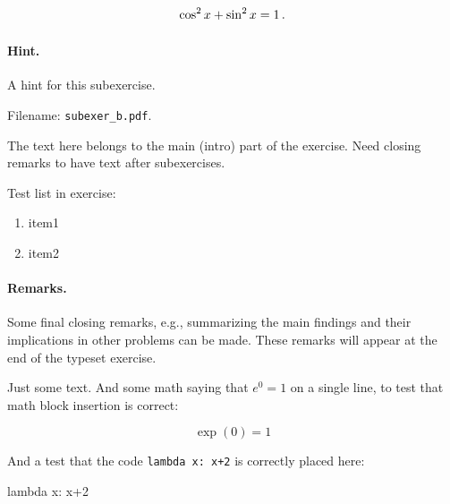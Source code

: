 \documentclass[%
oneside,                 %
final,                   %
10pt]{article}
\newenvironment{doconceexercise}{}{}
\theoremstyle{definition}
\begin{document}
\begin{enumerate}
\begin{doconceexercise}
\[ \cos^2 x + \sin^2 x = 1 \thinspace .\]


\paragraph{Hint.}
A hint for this subexercise.

\noindent Filename: \Verb!subexer_b.pdf!.


The text here belongs to the main (intro) part of the exercise. Need
closing remarks to have text after subexercises.

Test list in exercise:

\begin{enumerate}
\item item1

\item item2
\end{enumerate}

\noindent


\paragraph{Remarks.}
Some final closing remarks, e.g., summarizing the main findings
and their implications in other problems can be made. These
remarks will appear at the end of the typeset exercise.

\end{doconceexercise}

\begin{doconceexercise}



Just some text. And some math saying that $e^0=1$ on a single line,
to test that math block insertion is correct:

\[ \exp{(0)} = 1 \]

And a test that the code \texttt{lambda x: x+2} is correctly placed here:



\bdat
lambda x: x+2


\end{doconceexercise}
\end{enumerate}
\end{document}
